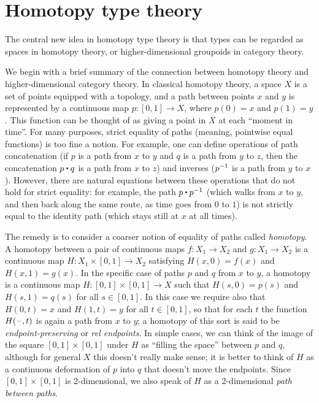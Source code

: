 \chapter{Homotopy type theory}
\label{cha:basics}

The central new idea in homotopy type theory is that types can be regarded as
spaces in homotopy theory, or higher-dimensional groupoids in category
theory.

We begin with a brief summary of the connection between homotopy theory
and higher-dimensional category theory.
In classical homotopy theory, a space $X$ is a set of points equipped
with a topology,
and a path between points $x$ and $y$ is represented by
a continuous map $p : [0,1] \to X$, where $p(0) = x$ and $p(1) = y$.
This function can be thought of as giving a point in $X$ at each
``moment in time''.  For many purposes, strict equality of paths
(meaning, pointwise equal functions) is too fine a notion.  For example,
one can define operations of path concatenation (if $p$ is a path from
$x$ to $y$ and $q$ is a path from $y$ to $z$, then the concatenation $p
\ct q$ is a path from $x$ to $z$) and inverses ($\mathord{{p}^{-1}}$ is a path
from $y$ to $x$).  However, there are natural equations between these
operations that do not hold for strict equality: for example, the path
$p \ct \opp p$ (which walks from $x$ to $y$, and then back along the
same route, as time goes from $0$ to $1$) is not strictly equal to the
identity path (which stays still at $x$ at all times).

The remedy is to consider a coarser notion of equality of paths called
\emph{homotopy}.
A homotopy between a pair of continuous maps $f :
X_1 \to X_2$ and $g : X_1\to X_2$ is a continuous map $H : X_1
\times [0, 1] \to X_2$ satisfying $H(x, 0) = f (x)$ and $H(x, 1) =
g(x)$.  In the specific case of paths $p$ and $q$ from $x$ to $y$, a homotopy is a
continuous map $H : [0,1] \times [0,1] \rightarrow X$
such that $H(s,0) = p(s)$ and $H(s,1) = q(s)$ for all $s\in [0,1]$.
In this case we require also that $H(0,t) = x$ and $H(1,t)=y$ for all $t\in [0,1]$,
so that for each $t$ the function $H(\mathord{\hspace{1pt}\text{--}\hspace{1pt}},t)$ is again a path from $x$ to $y$;
a homotopy of this sort is said to be \emph{endpoint-preserving} or \emph{rel endpoints}.
In simple cases, we can think of the image of the square $[0,1]\times [0,1]$ under $H$ as ``filling the space'' between $p$ and $q$, although for general $X$ this doesn't really make sense; it is better to think of $H$ as a continuous deformation of $p$ into $q$ that doesn't move the endpoints.
Since $[0,1]\times [0,1]$ is 2-dimensional, we also speak of $H$ as a 2-dimensional \emph{path between paths}.

